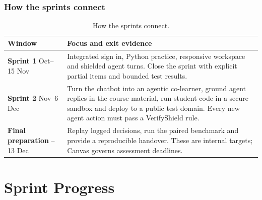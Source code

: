 \documentclass[11pt,a4paper]{article}
\begin{document}
\subsubsection{How the sprints connect}
{\small
\begin{longtable}{>{\raggedright\arraybackslash}p{}>{\raggedright\arraybackslash}p{}}
\caption{How the sprints connect.}\\
\toprule
\textbf{Window} & \textbf{Focus and exit evidence} \\
\midrule
\endhead
\textbf{Sprint 1} \newline 26 Oct--15 Nov & Integrated sign in, Python practice, responsive workspace and shielded agent turns. Close the sprint with explicit partial items and bounded test results. \\
\textbf{Sprint 2} \newline 16 Nov--6 Dec & Turn the chatbot into an agentic co-learner, ground agent replies in the course material, run student code in a secure sandbox and deploy to a public test domain. Every new agent action must pass a VerifyShield rule. \\
\textbf{Final preparation} \newline 7--13 Dec & Replay logged decisions, run the paired benchmark and provide a reproducible handover. These are internal targets; Canvas governs assessment deadlines. \\
\bottomrule
\end{longtable}}
\section{Sprint Progress}
\end{document}
